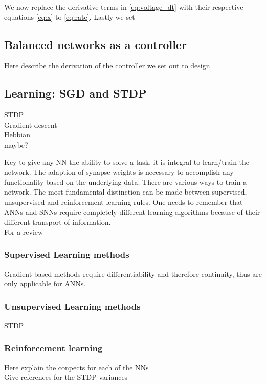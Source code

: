 We now replace the derivative terms in \cref{eq:voltage_dt} with their respective equations \cref{eq:x} to \cref{eq:rate}. Lastly we set

\subsection{Balanced networks as a controller}
Here describe the derivation of the controller we set out to design




\subsection{Learning: SGD and STDP}
STDP\\
Gradient descent\\
Hebbian\\
maybe?

Key to give any \ac{NN} the ability to solve a task, it is integral to learn/train the network. The adaption of synapse weights is necessary to accomplish any functionality based on the underlying data\cite{zheng_introductory_2022}. There are various ways to train a network. The most fundamental distinction can be made between supervised, unsupervised and reinforcement learning rules.
One needs to remember that \acp{ANN} and \acp{SNN} require completely different learning algorithms because of their different transport of information.\\
For a review

\subsubsection{Supervised Learning methods}
Gradient based methods require differentiability and therefore continuity, thus are only applicable for \acp{ANN}.\\

\subsubsection{Unsupervised Learning methods}
STDP
\subsubsection{Reinforcement learning}



Here explain the conpects for each of the NNs\\
Give references for the STDP variances\\

